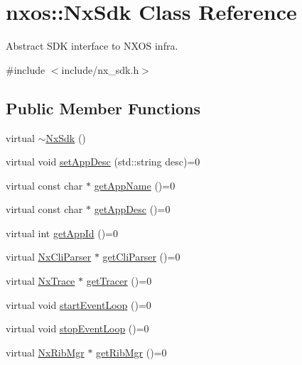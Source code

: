 \hypertarget{classnxos_1_1_nx_sdk}{}\section{nxos\+:\+:Nx\+Sdk Class Reference}
\label{classnxos_1_1_nx_sdk}


Abstract S\+DK interface to N\+X\+OS infra.  




{\ttfamily \#include $<$include/nx\+\_\+sdk.\+h$>$}

\subsection*{Public Member Functions}
\begin{DoxyCompactItemize}
\item 
virtual \mbox{\hyperlink{classnxos_1_1_nx_sdk_a6b5028045019af4be6c8356ec0fdaff9}{$\sim$\+Nx\+Sdk}} ()
\item 
virtual void \mbox{\hyperlink{classnxos_1_1_nx_sdk_a2c6007a383114285951b2d2a062dacec}{set\+App\+Desc}} (std\+::string desc)=0
\item 
virtual const char $\ast$ \mbox{\hyperlink{classnxos_1_1_nx_sdk_a9ba7da2cd8cb4f82438135ee651efdb0}{get\+App\+Name}} ()=0
\item 
virtual const char $\ast$ \mbox{\hyperlink{classnxos_1_1_nx_sdk_ad6964fa8ee52a8b0a22c27abdcf871e3}{get\+App\+Desc}} ()=0
\item 
virtual int \mbox{\hyperlink{classnxos_1_1_nx_sdk_ac82af6d262439275f27c745082bf3fd7}{get\+App\+Id}} ()=0
\item 
virtual \mbox{\hyperlink{classnxos_1_1_nx_cli_parser}{Nx\+Cli\+Parser}} $\ast$ \mbox{\hyperlink{classnxos_1_1_nx_sdk_a98bcb70d1bf60e38b41eacdf0a72dc89}{get\+Cli\+Parser}} ()=0
\item 
virtual \mbox{\hyperlink{classnxos_1_1_nx_trace}{Nx\+Trace}} $\ast$ \mbox{\hyperlink{classnxos_1_1_nx_sdk_ad2c729bd12d1b9f4bf06f4b70fe28347}{get\+Tracer}} ()=0
\item 
virtual void \mbox{\hyperlink{classnxos_1_1_nx_sdk_a75ca70643fe325ddf0eea62c1f8c4cc8}{start\+Event\+Loop}} ()=0
\item 
virtual void \mbox{\hyperlink{classnxos_1_1_nx_sdk_adc80e6f244a7cbc050f9dacbc8018315}{stop\+Event\+Loop}} ()=0
\item 
virtual \mbox{\hyperlink{classnxos_1_1_nx_rib_mgr}{Nx\+Rib\+Mgr}} $\ast$ \mbox{\hyperlink{classnxos_1_1_nx_sdk_a3cdb42126b1132cf9aa00426a8d5d428}{get\+Rib\+Mgr}} ()=0

\end{DoxyCompactItemize}
